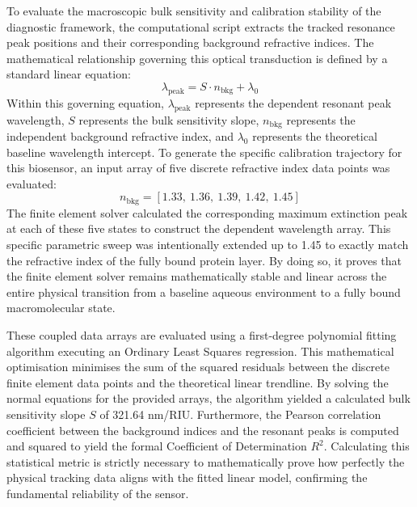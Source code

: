 \documentclass[class=report, crop=false]{standalone}
\begin{document}
To evaluate the macroscopic bulk sensitivity and calibration stability of the diagnostic framework, the computational script extracts the tracked resonance peak positions and their corresponding background refractive indices. The mathematical relationship governing this optical transduction is defined by a standard linear equation:
\begin{equation}
\lambda_{\text{peak}} = S \cdot n_{\text{bkg}} + \lambda_0
\label{eq:bulk_sensitivity}
\end{equation}
Within this governing equation, $\lambda_{\text{peak}}$ represents the dependent resonant peak wavelength, $S$ represents the bulk sensitivity slope, $n_{\text{bkg}}$ represents the independent background refractive index, and $\lambda_0$ represents the theoretical baseline wavelength intercept. To generate the specific calibration trajectory for this biosensor, an input array of five discrete refractive index data points was evaluated:
\begin{equation}
n_{\text{bkg}} = [1.33,\ 1.36,\ 1.39,\ 1.42,\ 1.45]
\label{eq:n_array}
\end{equation}
The finite element solver calculated the corresponding maximum extinction peak at each of these five states to construct the dependent wavelength array. This specific parametric sweep was intentionally extended up to 1.45 to exactly match the refractive index of the fully bound protein layer. By doing so, it proves that the finite element solver remains mathematically stable and linear across the entire physical transition from a baseline aqueous environment to a fully bound macromolecular state.

\vspace{12pt}

These coupled data arrays are evaluated using a first-degree polynomial fitting algorithm executing an Ordinary Least Squares regression. This mathematical optimisation minimises the sum of the squared residuals between the discrete finite element data points and the theoretical linear trendline. By solving the normal equations for the provided arrays, the algorithm yielded a calculated bulk sensitivity slope $S$ of 321.64 nm/RIU. Furthermore, the Pearson correlation coefficient between the background indices and the resonant peaks is computed and squared to yield the formal Coefficient of Determination $R^2$. Calculating this statistical metric is strictly necessary to mathematically prove how perfectly the physical tracking data aligns with the fitted linear model, confirming the fundamental reliability of the sensor.
\end{document}
